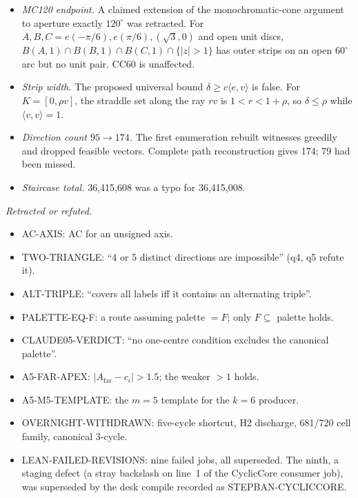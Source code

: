 \documentclass[11pt]{article}
\theoremstyle{definition}
\theoremstyle{remark}
\begin{document}
\begin{itemize}
\item \emph{MC120 endpoint.} A claimed extension of the monochromatic-cone
argument to aperture exactly $120^\circ$ was retracted. For
$A,B,C=e(-\pi/6),e(\pi/6),(\sqrt3,0)$ and open unit discs,
$B(A,1)\cap B(B,1)\cap B(C,1)\cap\{|z|>1\}$ has outer strips on an open
$60^\circ$ arc but no unit pair. CC60 is unaffected.
\item \emph{Strip width.} The proposed universal bound
$\delta\ge c\langle e,v\rangle$ is false. For $K=[0,\rho v]$, the straddle
set along the ray $rv$ is $1<r<1+\rho$, so $\delta\le\rho$ while
$\langle v,v\rangle=1$.
\item \emph{Direction count $95\to174$.} The first enumeration rebuilt
witnesses greedily and dropped feasible vectors. Complete path reconstruction
gives 174; 79 had been missed.
\item \emph{Staircase total.} 36{,}415{,}608 was a typo for 36{,}415{,}008.
\end{itemize}

\emph{Retracted or refuted.}
\begin{itemize}
\item AC-AXIS: AC for an unsigned axis.
\item TWO-TRIANGLE: ``4 or 5 distinct directions are impossible'' (q4, q5
refute it).
\item ALT-TRIPLE: ``covers all labels iff it contains an alternating triple''.
\item PALETTE-EQ-F: a route assuming palette $=F$; only $F\subseteq$ palette
holds.
\item CLAUDE05-VERDICT: ``no one-centre condition excludes the canonical
palette''.
\item A5-FAR-APEX: $|A_{\mathrm{far}}-c_i|>1.5$; the weaker $>1$ holds.
\item A5-M5-TEMPLATE: the $m=5$ template for the $k=6$ producer.
\item OVERNIGHT-WITHDRAWN: five-cycle shortcut, H2 discharge, 681/720 cell
family, canonical 3-cycle.
\item LEAN-FAILED-REVISIONS: nine failed jobs, all superseded. The ninth, a staging defect (a stray backslash on line~1 of the CyclicCore consumer job), was superseded by the desk compile recorded as STEPBAN-CYCLICCORE.
\end{itemize}
\end{document}
